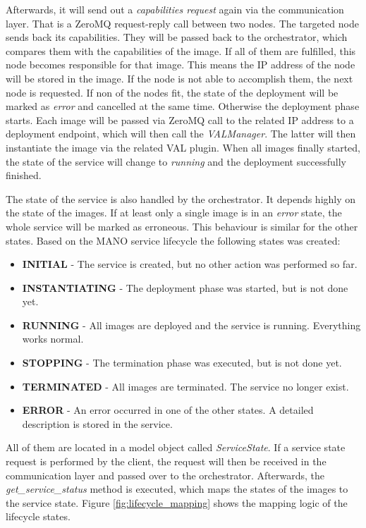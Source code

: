 Afterwards, it will send out a \textit{capabilities request} again via the communication layer.
That is a ZeroMQ request-reply call between two nodes.
The targeted node sends back its capabilities.
They will be passed back to the orchestrator, which compares them with the capabilities of the image.
If all of them are fulfilled, this node becomes responsible for that image.
This means the \ac{IP} address of the node will be stored in the image.
If the node is not able to accomplish them, the next node is requested.
If non of the nodes fit, the state of the deployment will be marked as \textit{error} and cancelled at the same time.
Otherwise the deployment phase starts.
Each image will be passed via ZeroMQ call to the related \ac{IP} address to a deployment endpoint, which will then call the \textit{VALManager}.
The latter will then instantiate the image via the related \ac{VAL} plugin.
When all images finally started, the state of the service will change to \textit{running} and the deployment successfully finished.\newline

The state of the service is also handled by the orchestrator.
It depends highly on the state of the images.
If at least only a single image is in an \textit{error} state, the whole service will be marked as erroneous.
This behaviour is similar for the other states.
Based on the \ac{MANO} service lifecycle the following states was created:\newline

\begin{itemize}
  \item \textbf{INITIAL} - The service is created, but no other action was performed so far.
  \item \textbf{INSTANTIATING} - The deployment phase was started, but is not done yet.
  \item \textbf{RUNNING} - All images are deployed and the service is running. Everything works normal.
  \item \textbf{STOPPING} - The termination phase was executed, but is not done yet.
  \item \textbf{TERMINATED} - All images are terminated. The service no longer exist.
  \item \textbf{ERROR} - An error occurred in one of the other states. A detailed description is stored in the service.
\end{itemize}
\bigskip

All of them are located in a model object called \textit{ServiceState}.
If a service state request is performed by the client, the request will then be received in the communication layer and passed over to the orchestrator.
Afterwards, the \textit{get\_service\_status} method is executed, which maps the states of the images to the service state.
Figure \ref{fig:lifecycle_mapping} shows the mapping logic of the lifecycle states.\newline

